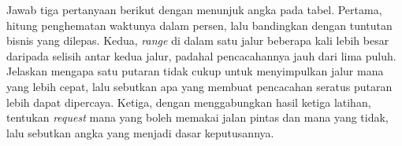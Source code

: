 Jawab tiga pertanyaan berikut dengan menunjuk angka pada tabel. Pertama, hitung
penghematan waktunya dalam persen, lalu bandingkan dengan tuntutan bisnis yang
dilepas. Kedua, \textit{range} di dalam satu jalur beberapa kali lebih besar daripada
selisih antar kedua jalur, padahal pencacahannya jauh dari lima puluh. Jelaskan
mengapa satu putaran tidak cukup untuk
menyimpulkan jalur mana yang lebih cepat, lalu sebutkan apa yang membuat
pencacahan seratus putaran lebih dapat dipercaya. Ketiga, dengan menggabungkan hasil ketiga
latihan, tentukan \textit{request} mana yang boleh memakai jalan pintas dan mana yang
tidak, lalu sebutkan angka yang menjadi dasar keputusannya.
